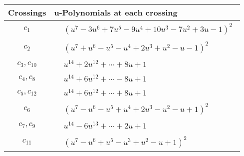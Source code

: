 \documentclass[1p]{elsarticle_modified}
\theoremstyle{definition}
\begin{document}
\begin{tabular}{m{50pt}|m{274pt}}
Crossings & \hspace{64pt}u-Polynomials at each crossing \\
\hline $$\begin{aligned}c_{1}\end{aligned}$$&$\begin{aligned}
&(u^7-3 u^6+7 u^5-9 u^4+10 u^3-7 u^2+3 u-1)^2
\end{aligned}$\\
\hline $$\begin{aligned}c_{2}\end{aligned}$$&$\begin{aligned}
&(u^7+u^6- u^5- u^4+2 u^3+u^2- u-1)^2
\end{aligned}$\\
\hline $$\begin{aligned}c_{3},c_{10}\end{aligned}$$&$\begin{aligned}
&u^{14}+2 u^{12}+\cdots+8 u+1
\end{aligned}$\\
\hline $$\begin{aligned}c_{4},c_{8}\end{aligned}$$&$\begin{aligned}
&u^{14}+6 u^{12}+\cdots-8 u+1
\end{aligned}$\\
\hline $$\begin{aligned}c_{5},c_{12}\end{aligned}$$&$\begin{aligned}
&u^{14}+6 u^{12}+\cdots+8 u+1
\end{aligned}$\\
\hline $$\begin{aligned}c_{6}\end{aligned}$$&$\begin{aligned}
&(u^7- u^6- u^5+u^4+2 u^3- u^2- u+1)^2
\end{aligned}$\\
\hline $$\begin{aligned}c_{7},c_{9}\end{aligned}$$&$\begin{aligned}
&u^{14}-6 u^{13}+\cdots+2 u+1
\end{aligned}$\\
\hline $$\begin{aligned}c_{11}\end{aligned}$$&$\begin{aligned}
&(u^7- u^6+u^5- u^3+u^2- u+1)^2
\end{aligned}$\\
\hline
\end{tabular}\\~\\
\end{document}
